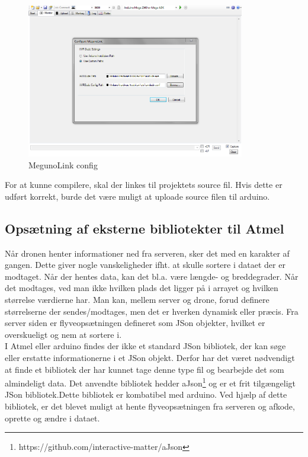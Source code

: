 \begin{figure}[H]
	\centering
	\includegraphics[width=0.85\textwidth]{Billeder/implementation/megunolink_config.png}
	\vspace{-.5cm}
	\caption{MegunoLink config}
	\label{fig:meglinkconf}
\end{figure}

For at kunne compilere, skal der linkes til projektets source fil. Hvis dette er udført korrekt, burde det være muligt at uploade source filen til arduino.

\subsection{Opsætning af eksterne bibliotekter til Atmel}

Når dronen henter informationer ned fra serveren, sker det med en karakter af gangen. Dette giver nogle vanskeligheder ifht. at skulle sortere i dataet der er modtaget. Når der hentes data, kan det bl.a. være længde- og breddegrader. Når det modtages, ved man ikke hvilken plads det ligger på i arrayet og hvilken størrelse værdierne har. Man kan, mellem server og drone, forud definere størrelserne der sendes/modtages, men det er hverken dynamisk eller præcis. Fra server siden er flyveopsætningen defineret som JSon objekter, hvilket er overskueligt og nem at sortere i. \\
I Atmel eller arduino findes der ikke et standard JSon bibliotek, der kan søge eller erstatte informationerne i et JSon objekt. Derfor har det været nødvendigt at finde et bibliotek der har kunnet tage denne type fil og bearbejde det som almindeligt data. Det anvendte bibliotek hedder aJson\footnote{https://github.com/interactive-matter/aJson} og er et frit tilgængeligt JSon bibliotek.Dette bibliotek er kombatibel med arduino. Ved hjælp af dette bibliotek, er det blevet muligt at hente flyveopsætningen fra serveren og afkode, oprette og ændre i dataet.
